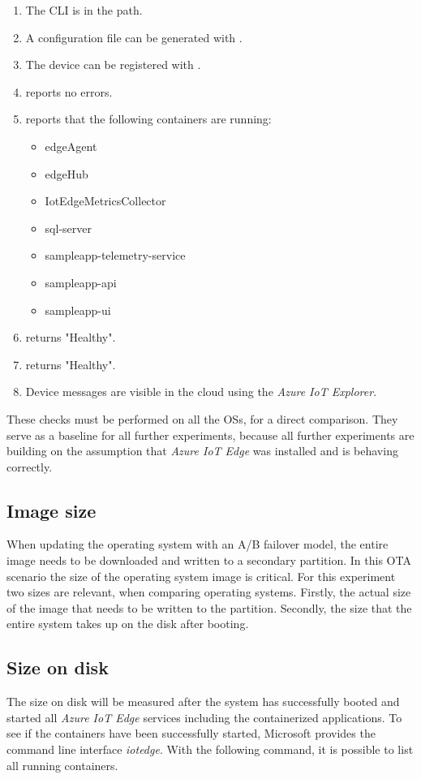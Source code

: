\begin{enumerate}
    \item The  \ac{CLI} is in the path.
    \item A configuration file can be generated with .
    \item The device can be registered with .
    \item {} reports no errors.
    \item {} reports that the following containers
    are running:
    \begin{itemize}
        \item edgeAgent
        \item edgeHub
        \item IotEdgeMetricsCollector
        \item sql-server
        \item sampleapp-telemetry-service
        \item sampleapp-api
        \item sampleapp-ui
    \end{itemize}
    \item {} returns "Healthy".
    \item {} returns "Healthy".
    \item Device messages are visible in the cloud using the \textit{Azure IoT Explorer}.
\end{enumerate}
These checks must be performed on all the \ac{OS}s, for a direct comparison.
They serve as a baseline for all further experiments, because all further
experiments are building on the assumption that \textit{Azure IoT Edge} was
installed and is behaving correctly.

\subsection{Image size}
When updating the operating system with an A/B failover model, the entire
image needs to be downloaded and written to a secondary partition. In this
\ac{OTA} scenario the size of the operating system image is critical.
For this experiment two sizes are relevant, when comparing operating systems.
Firstly, the actual size of the image that needs to be written to the partition.
Secondly, the size that the entire system takes up on the disk after booting.

\subsection{Size on disk}
The size on disk will be measured after the system has successfully booted
and started all \textit{Azure IoT Edge} services including the containerized
applications. To see if the containers have been successfully started,
Microsoft provides the command line interface \textit{iotedge}.
With the following command, it is possible to list all running containers.\\

